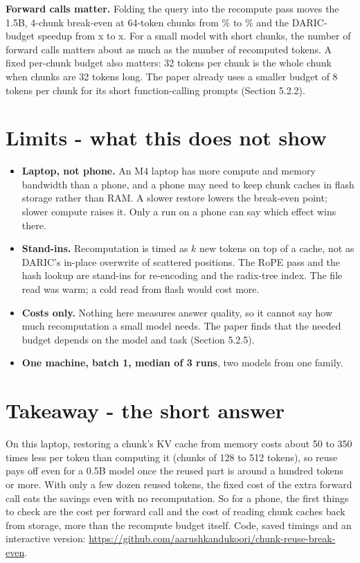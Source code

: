 \documentclass[10pt]{article}
\begin{document}
\textbf{Forward calls matter.} Folding the query into the recompute pass moves the 1.5B, 4-chunk break-even at 64-token
chunks from \beBfourlxiv\% to \bemergedBfourlxiv\% and the DARIC-budget speedup from \sdaricBfourlxiv x to
\sdaricmBfourlxiv x. For a small model with short chunks, the number of forward calls matters about as much as the number
of recomputed tokens. A fixed per-chunk budget also matters: 32 tokens per chunk is the whole chunk when chunks are
32 tokens long. The paper already uses a smaller budget of 8 tokens per chunk for its short function-calling prompts
(Section 5.2.2).

\section{Limits - what this does not show}
\begin{itemize}\setlength{\itemsep}{1pt}
\item \textbf{Laptop, not phone.} An M4 laptop has more compute and memory bandwidth than a phone, and a phone may need to
keep chunk caches in flash storage rather than RAM. A slower restore lowers the break-even point; slower compute raises it.
Only a run on a phone can say which effect wins there.
\item \textbf{Stand-ins.} Recomputation is timed as $k$ new tokens on top of a cache, not as DARIC's in-place overwrite of
scattered positions. The RoPE pass and the hash lookup are stand-ins for re-encoding and the radix-tree index. The file
read was warm; a cold read from flash would cost more.
\item \textbf{Costs only.} Nothing here measures answer quality, so it cannot say how much recomputation a small model needs.
The paper finds that the needed budget depends on the model and task (Section 5.2.5).
\item \textbf{One machine, batch 1, median of 3 runs}, two models from one family.
\end{itemize}

\section{Takeaway - the short answer}
On this laptop, restoring a chunk's KV cache from memory costs about 50 to 350 times less per token than computing it
(chunks of 128 to 512 tokens), so reuse pays
off even for a 0.5B model once the reused part is around a hundred tokens or more. With only a few dozen reused tokens,
the fixed cost of the extra forward call eats the savings even with no recomputation. So for a phone, the first things to check are the cost
per forward call and the cost of reading chunk caches back from storage, more than the recompute budget itself. Code, saved
timings and an interactive version: \url{https://github.com/aarushkandukoori/chunk-reuse-break-even}.
\end{document}
